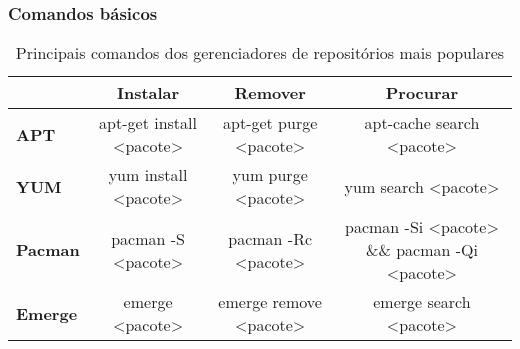 




\subsubsection{Comandos básicos} %
\label{subs:comandos_basicos}


\begin{table}[htbp]
\caption{Principais comandos dos gerenciadores de repositórios mais populares}
\begin{tabular}{|l|c|c|c|}
\hline
& \textbf{Instalar} & \textbf{Remover} & \textbf{Procurar} \\ \hline
\textbf{APT} & apt-get install <pacote> & apt-get purge <pacote> & apt-cache search <pacote> \\ \hline
\textbf{YUM} & yum install <pacote> & yum purge <pacote> & yum search <pacote> \\ \hline
\textbf{Pacman} & pacman -S <pacote> & pacman -Rc <pacote> & pacman -Si  <pacote> \&\& pacman -Qi  <pacote> \\ \hline
\textbf{Emerge} & emerge <pacote> & emerge remove <pacote> & emerge search <pacote> \\ \hline
\end{tabular}
\label{cmd_gerenciadores}
\end{table}
